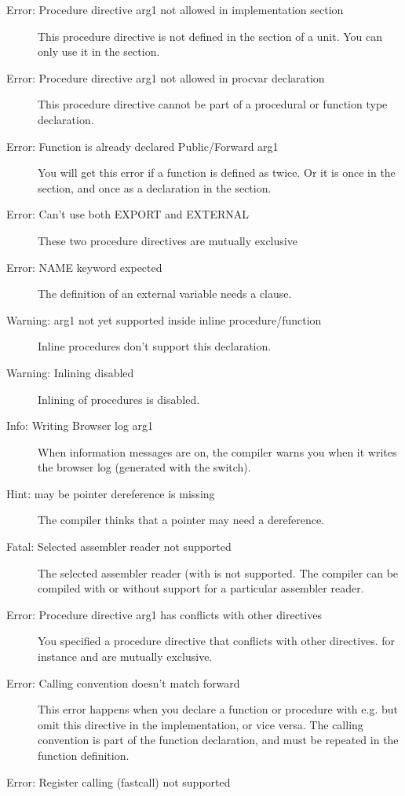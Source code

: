 \begin{description}
\item [Error: Procedure directive arg1 not allowed in implementation section]
 This procedure directive is not defined in the  section of
 a unit. You can only use it in the  section.
\item [Error: Procedure directive arg1 not allowed in procvar declaration]
 This procedure directive cannot be part of a procedural or function
 type declaration.
\item [Error: Function is already declared Public/Forward arg1]
 You will get this error if a function is defined as  twice.
 Or it is once in the  section, and once as a 
 declaration in the  section.
\item [Error: Can't use both EXPORT and EXTERNAL]
 These two procedure directives are mutually exclusive
\item [Error: NAME keyword expected]
 The definition of an external variable needs a  clause.
\item [Warning: arg1 not yet supported inside inline procedure/function]
 Inline procedures don't support this declaration.
\item [Warning: Inlining disabled]
 Inlining of procedures is disabled.
\item [Info: Writing Browser log arg1]
 When information messages are on, the compiler warns you when it
 writes the browser log (generated with the  switch).
\item [Hint: may be pointer dereference is missing]
 The compiler thinks that a pointer may need a dereference.
\item [Fatal: Selected assembler reader not supported]
 The selected assembler reader (with  is not
 supported. The compiler can be compiled with or without support for a
 particular assembler reader.
\item [Error: Procedure directive arg1 has conflicts with other directives]
 You specified a procedure directive that conflicts with other directives.
 for instance  and  are mutually exclusive.
\item [Error: Calling convention doesn't match forward]
 This error happens when you declare a function or procedure with
 e.g.  but omit this directive in the implementation, or vice
 versa. The calling convention is part of the function declaration, and
 must be repeated in the function definition.
\item [Error: Register calling (fastcall) not supported]

\end{description}
